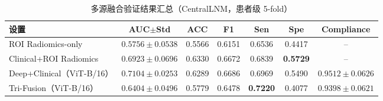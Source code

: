 \begin{table}[H]
\centering
\caption{多源融合验证结果汇总（CentralLNM，患者级 5-fold）}
\label{tab:tri_source}
\footnotesize
\setlength{\tabcolsep}{4pt}
\begin{tabular}{lcccccc}
\toprule
设置 & AUC$\pm$Std & ACC & F1 & Sen & Spe & Compliance \\
\midrule
ROI Radiomics-only & $0.5756\pm0.0538$ & 0.5566 & 0.6151 & 0.6536 & 0.4417 & -- \\
Clinical+ROI Radiomics & $0.6923\pm0.0696$ & 0.6330 & 0.6672 & 0.6839 & \textbf{0.5729} & -- \\
Deep+Clinical（ViT-B/16） & $\mathbf{0.7104\pm0.0253}$ & 0.6289 & 0.6686 & 0.6969 & 0.5490 & $\mathbf{0.9512\pm0.0626}$ \\
Tri-Fusion（ViT-B/16） & $0.6404\pm0.0496$ & 0.5779 & 0.6478 & \textbf{0.7220} & 0.4077 & $0.9398\pm0.0621$ \\
\bottomrule
\end{tabular}
\end{table}
